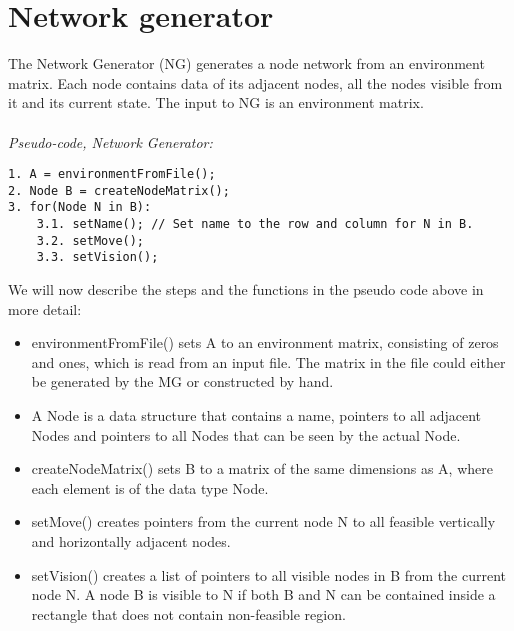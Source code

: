 \section{Network generator}
The Network Generator (NG) generates a node network from an environment matrix. Each node contains data of its adjacent nodes, all the nodes visible from it and its current state. The input to NG is an environment matrix.\\
\\
\noindent \emph{Pseudo-code, Network Generator:}
\begin{verbatim}
1. A = environmentFromFile();
2. Node B = createNodeMatrix();
3. for(Node N in B):
    3.1. setName(); // Set name to the row and column for N in B.
    3.2. setMove();
    3.3. setVision();
\end{verbatim}
We will now describe the steps and the functions in the pseudo code above in more detail:
\begin{itemize}
\item environmentFromFile() sets A to an environment matrix, consisting of zeros and ones, which is read from an input file. The matrix in the file could either be generated by the MG or constructed by hand.
\item A Node is a data structure that contains a name, pointers to all adjacent Nodes and pointers to all Nodes that can be seen by the actual Node.
\item createNodeMatrix() sets B to a matrix of the same dimensions as A, where each element is of the data type Node.
\item setMove() creates pointers from the current node N to all feasible vertically and horizontally adjacent nodes.
\item setVision() creates a list of pointers to all visible nodes in B from the current node N. A node B is visible to N if both B and N can be contained inside a rectangle that does not contain non-feasible region.
\end{itemize}